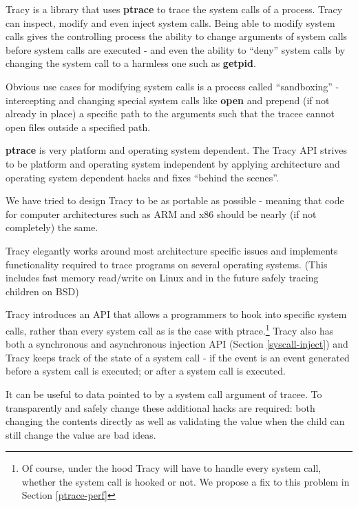 \documentclass[a4paper, 10pt]{report}
\begin{document}
Tracy is a library that uses \textbf{ptrace} to trace the system calls of
a process. Tracy can inspect, modify and even inject system calls. Being able to
modify system calls gives the controlling process the ability to change
arguments of system calls before system calls are executed - and even the
ability to ``deny'' system calls by changing the system call to a harmless
one such as \textbf{getpid}.

Obvious use cases for modifying system calls is a process
called ``sandboxing'' - intercepting and changing special system calls like
\textbf{open} and prepend (if not already in place) a specific path to the
arguments such that the tracee cannot open files outside a specified path.

\textbf{ptrace} is very platform and operating system dependent.
The Tracy API strives to be platform and operating system independent by
applying architecture and operating system dependent hacks and fixes
``behind the scenes''.

We have tried to design Tracy to be as portable as possible - meaning that code
for computer architectures such as ARM and x86 should be nearly
(if not completely) the same.


Tracy elegantly works around most architecture specific issues and implements
functionality required to trace programs on several operating systems.
(This includes fast memory read/write on Linux and in the future safely tracing
children on BSD)

Tracy introduces an API that allows a programmers to hook into specific system
calls, rather than every system call as is the case with ptrace.\footnote{Of
course, under the hood Tracy will have to handle every system call, whether
the system call is hooked or not. We propose a fix to this problem in
Section \ref{ptrace-perf}} Tracy also has both a synchronous and asynchronous
injection API (Section \ref{syscall-inject}) and Tracy keeps
track of the state of a system call - if the event is an event generated before
a system call is executed; or after a system call is executed.

It can be useful to data pointed to by a system call argument of tracee.
To transparently and safely change these additional hacks are required:
both changing the contents directly as well as validating the value when the child
can still change the value are bad ideas.
\end{document}
